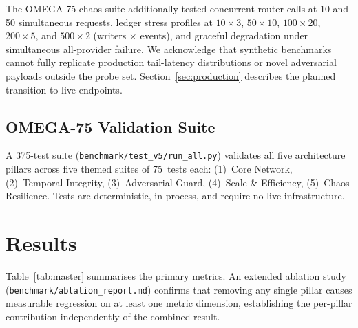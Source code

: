 \documentclass[11pt,twocolumn]{article}
\begin{document}
The OMEGA-75 chaos suite additionally tested concurrent router calls
at 10 and 50 simultaneous requests, ledger stress profiles at
$10{\times}3$, $50{\times}10$, $100{\times}20$, $200{\times}5$, and
$500{\times}2$ (writers $\times$ events), and graceful degradation
under simultaneous all-provider failure. We acknowledge that synthetic
benchmarks cannot fully replicate production tail-latency distributions
or novel adversarial payloads outside the probe set.
Section~\ref{sec:production} describes the planned transition to live
endpoints.

\subsection{OMEGA-75 Validation Suite}

A 375-test suite (\texttt{benchmark/test\_v5/run\_all.py})
validates all five architecture pillars across five themed suites of
75~tests each: (1)~Core Network, (2)~Temporal Integrity,
(3)~Adversarial Guard, (4)~Scale \& Efficiency, (5)~Chaos Resilience.
Tests are deterministic, in-process, and require no live infrastructure.

\section{Results}
\label{sec:results}

Table~\ref{tab:master} summarises the primary metrics. An
extended ablation study (\texttt{benchmark/ablation\_report.md})
confirms that removing any single pillar causes measurable regression
on at least one metric dimension, establishing the per-pillar contribution
independently of the combined result.
\end{document}
